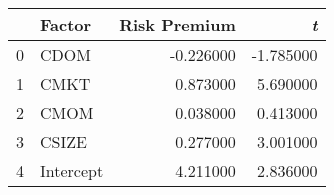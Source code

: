 \begin{tabular}{llrr}
\toprule
 & Factor & Risk Premium & \emph{t} \\
\midrule
0 & CDOM & -0.226000 & -1.785000 \\
1 & CMKT & 0.873000 & 5.690000 \\
2 & CMOM & 0.038000 & 0.413000 \\
3 & CSIZE & 0.277000 & 3.001000 \\
4 & Intercept & 4.211000 & 2.836000 \\
\bottomrule
\end{tabular}
